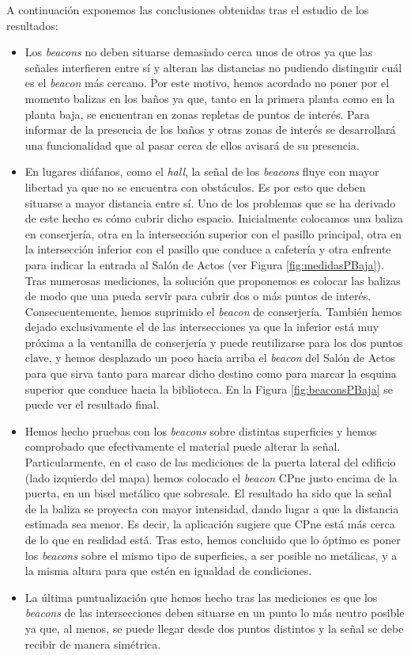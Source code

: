 A continuación exponemos las conclusiones obtenidas tras el estudio de los resultados:
\begin{itemize}
	\item Los \textit{beacons} no deben situarse demasiado cerca unos de otros ya que las señales interfieren entre sí y alteran las distancias no pudiendo distinguir cuál es el \textit{beacon} más cercano. Por este motivo, hemos acordado no poner por el momento balizas en los baños ya que, tanto en la primera planta como en la planta baja, se encuentran en zonas repletas de puntos de interés. Para informar de la presencia de los baños y otras zonas de interés se desarrollará una funcionalidad que al pasar cerca de ellos avisará de su presencia.
	
	\item En lugares diáfanos, como el \textit{hall}, la señal de los \textit{beacons} fluye con mayor libertad ya que no se encuentra con obstáculos. Es por esto que deben situarse a mayor distancia entre sí. Uno de los problemas que se ha derivado de este hecho es cómo cubrir dicho espacio. Inicialmente colocamos una baliza en conserjería, otra en la intersección superior con el pasillo principal, otra en la intersección inferior con el pasillo que conduce a cafetería y otra enfrente para indicar la entrada al Salón de Actos (ver Figura \ref{fig:medidasPBaja}). Tras numerosas mediciones, la solución que proponemos es colocar las balizas de modo que una pueda servir para cubrir dos o más puntos de interés. Consecuentemente, hemos suprimido el \textit{beacon} de conserjería. También hemos dejado exclusivamente el de las intersecciones ya que la inferior está muy próxima a la ventanilla de conserjería y puede reutilizarse para los dos puntos clave, y hemos desplazado un poco hacia arriba el \textit{beacon} del Salón de Actos para que sirva tanto para marcar dicho destino como para marcar la esquina superior que conduce hacia la biblioteca. En la Figura \ref{fig:beaconsPBaja} se puede ver el resultado final.
	
	\item Hemos hecho pruebas con los \textit{beacons} sobre distintas superficies y hemos comprobado que efectivamente el material puede alterar la señal. Particularmente, en el caso de las mediciones de la puerta lateral del edificio (lado izquierdo del mapa) hemos colocado el \textit{beacon} CPne justo encima de la puerta, en un bisel metálico que sobresale. El resultado ha sido que la señal de la baliza se proyecta con mayor intensidad, dando lugar a que la distancia estimada sea menor. Es decir, la aplicación sugiere que CPne está más cerca de lo que en realidad está. Tras esto, hemos concluido que lo óptimo es poner los \textit{beacons} sobre el mismo tipo de superficies, a ser posible no metálicas, y a la misma altura para que estén en igualdad de condiciones. 
	
	\item La última puntualización que hemos hecho tras las mediciones es que los \textit{beacons} de las intersecciones deben situarse en un punto lo más neutro posible ya que, al menos, se puede llegar desde dos puntos distintos y la señal se debe recibir de manera simétrica. 
\end{itemize}




